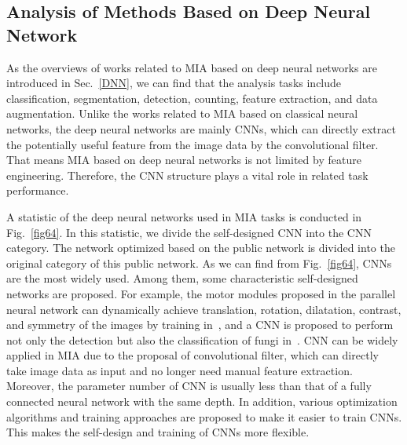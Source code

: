 \subsection{Analysis of Methods Based on Deep Neural Network}
As the overviews of works related to MIA based on deep neural networks are introduced in Sec.~\ref{DNN}, we can find that the analysis tasks include classification, segmentation, detection, counting, feature extraction, and data augmentation. Unlike the works related to MIA based on classical neural networks, the deep neural networks are mainly CNNs, which can directly extract the potentially useful feature from the image data by the convolutional filter. That means MIA based on deep neural networks is not limited by feature engineering. Therefore, the CNN structure plays a vital role in related task performance.

A statistic of the deep neural networks used in MIA tasks is conducted in Fig.~\ref{fig64}. In this statistic, we divide the self-designed CNN into the CNN category. The network optimized based on the public network is divided into the original category of this public network. As we can find from Fig.~\ref{fig64}, CNNs are the most widely used. Among them, some characteristic self-designed networks are proposed. For example, the motor modules proposed in the parallel neural network can dynamically achieve translation, rotation, dilatation, contrast, and symmetry of the images by training in~\cite{Beaufort-2004-ARCD}, and a CNN is proposed to perform not only the detection but also the classification of fungi in~\cite{Tahir-2018-AFSD}. CNN can be widely applied in MIA due to the proposal of convolutional filter, which can directly take image data as input and no longer need manual feature extraction. Moreover, the parameter number of CNN is usually less than that of a fully connected neural network with the same depth. In addition, various optimization algorithms and training approaches are proposed to make it easier to train CNNs. This makes the self-design and training of CNNs more flexible. 



